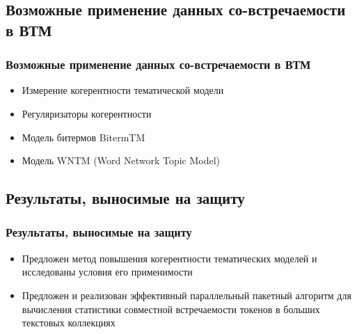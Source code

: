 \documentclass[unicode]{beamer}
\begin{document}
\subsection{Возможные применение данных со-встречаемости в ВТМ}
\begin{frame}

\frametitle{Возможные применение данных со-встречаемости в ВТМ}
\begin{itemize}
    \item Измерение когерентности тематической модели \newline
    \item Регуляризаторы когерентности \newline
    \item Модель битермов BitermTM \newline
    \item Модель WNTM (Word Network Topic Model)
\end{itemize}

\end{frame}

\subsection{Результаты, выносимые на защиту}
\begin{frame}
\frametitle{Результаты, выносимые на защиту}
\begin{itemize}
    \item Предложен метод повышения когерентности тематических моделей и исследованы условия его применимости \newline
    \item Предложен и реализован эффективный параллельный пакетный алгоритм для вычисления статистики совместной встречаемости токенов в больших текстовых коллекциях
\end{itemize}
\end{frame}
\end{document}
